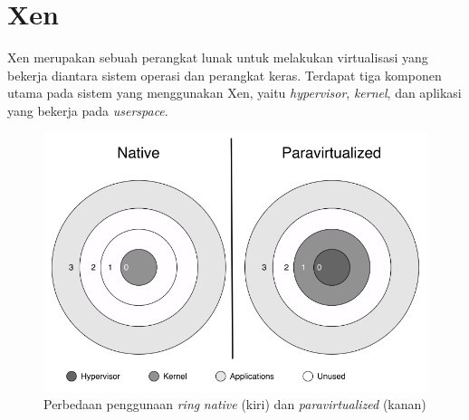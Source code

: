 \section{Xen}

Xen merupakan sebuah perangkat lunak untuk melakukan virtualisasi yang bekerja diantara sistem
operasi dan perangkat keras. Terdapat tiga komponen utama pada sistem yang menggunakan Xen,
yaitu \textit{hypervisor}, \textit{kernel}, dan aplikasi yang bekerja pada \textit{userspace}.

\begin{figure}[!ht]
    \includegraphics[scale=0.5]{./resources/xen-ring.png}
    \caption[Perbedaan penggunaan \textit{ring} \textit{native} dan
    \textit{paravirtualized}]{Perbedaan penggunaan \textit{ring} \textit{native} (kiri) dan
    \textit{paravirtualized} (kanan) \citep{Chisnall2014}}
    \label{figure:xen_ring}
\end{figure}

